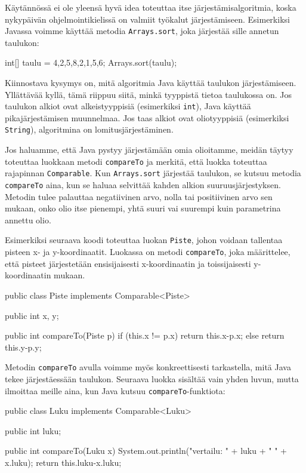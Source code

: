 Käytännössä ei ole yleensä hyvä idea toteuttaa itse
järjestämisalgoritmia, koska nykypäivän ohjelmointikielissä
on valmiit työkalut järjestämiseen.
Esimerkiksi Javassa voimme käyttää metodia \texttt{Arrays.sort},
joka järjestää sille annetun taulukon:

\begin{code}
int[] taulu = {4,2,5,8,2,1,5,6};
Arrays.sort(taulu);
\end{code}

Kiinnostava kysymys on, mitä algoritmia Java käyttää
taulukon järjes\-tämiseen.
Yllättävää kyllä, tämä riippuu siitä, minkä tyyppistä tietoa
taulukossa on.
Jos taulukon alkiot ovat alkeistyyppisiä
(esimerkiksi \texttt{int}), Java käyttää 
pikajärjestämisen muunnelmaa.
Jos taas alkiot ovat oliotyyppisiä
(esimerkiksi \texttt{String}),
algoritmina on lomitusjärjestäminen.

Jos haluamme, että Java pystyy järjestämään omia olioitamme,
meidän täytyy toteuttaa luokkaan metodi \texttt{compareTo} ja
merkitä, että luokka toteuttaa rajapinnan \texttt{Comparable}.
Kun \texttt{Arrays.sort} järjestää taulukon,
se kutsuu metodia \texttt{compareTo} aina, kun se haluaa selvittää
kahden alkion suuruusjärjestyksen.
Metodin tulee palauttaa negatiivinen arvo, nolla tai positiivinen arvo
sen mukaan, onko olio itse pienempi, yhtä suuri vai suurempi
kuin parametrina annettu olio.

Esimerkiksi seuraava koodi toteuttaa luokan \texttt{Piste},
johon voidaan tallentaa pisteen x- ja y-koordinaatit.
Luokassa on metodi \texttt{compareTo}, joka määrittelee,
että pisteet järjestetään ensisijaisesti x-koordinaatin ja
toissijaisesti y-koordinaatin mukaan.

\begin{code}
public class Piste implements Comparable<Piste> {
    public int x, y;

    public int compareTo(Piste p) {
        if (this.x != p.x) return this.x-p.x;
        else return this.y-p.y;
    }
}
\end{code}

Metodin \texttt{compareTo} avulla voimme myös konkreettisesti
tarkastella, mitä Java tekee järjestäessään taulukon.
Seuraava luokka sisältää vain yhden luvun,
mutta ilmoittaa meille aina, kun Java kutsuu
\texttt{compareTo}-funktiota:

\begin{code}
public class Luku implements Comparable<Luku> {
    public int luku;

    public int compareTo(Luku x) {
        System.out.println("vertailu: " + luku + " " + x.luku);
        return this.luku-x.luku;
    }
}
\end{code}

